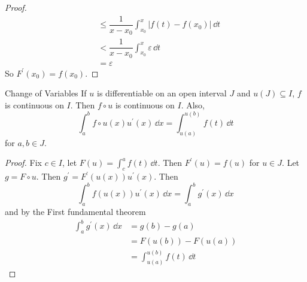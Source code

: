 \documentclass{report}
\begin{document}
\begin{proof}
\begin{align*}
                                                                                        &\leq \dfrac{1}{x - x_{0}} \int_{x_{0}}^{x} \lvert f(t) - f(x_{0}) \rvert \, \dd{ t} \\
                                                                                        &< \dfrac{ 1}{x - x_{0}} \int_{x_{0}}^{x} \varepsilon \, \dd{ t}  \\
                                                                                        &= \varepsilon
            \end{align*}
         So $F^{\prime}(x_{0}) = f(x_{0})$.
    \end{proof}

\begin{theorem}{Change of Variables}
    If $u$ is differentiable on an open interval $J$ and $u(J) \subseteq I$, $f$ is continuous on $I$. Then $f \circ u$ is continuous on $I$. Also, 
        \begin{equation*}
            \int_{a}^{b} f \circ u(x)u^{\prime}(x) \, \dd{x}  = \int_{u(a)}^{u(b)} f(t) \, \dd{t} 
        \end{equation*}
    for $a, b \in J$.
\end{theorem}
    \begin{proof}
        Fix $c \in I$, let $ F(u) = \int_{c}^{a} f(t) \, \dd{t} $. Then $F^{\prime}(u) = f(u)$ for $u \in J$. Let $g = F \circ u$. Then $g^{\prime} = F^{\prime}(u(x))u^{\prime}(x)$. Then
            \begin{equation*}
                \int_{a}^{b} f(u(x))u^{\prime}(x) \, \dd{x} = \int_{a}^{b} g^{\prime}(x) \, \dd{x} 
            \end{equation*}
        and by the First fundamental theorem
            \begin{align*}
                \int_{a}^{b} g^{\prime}(x) \, \dd{x} &= g(b) - g(a) \\
                                                     &= F(u(b)) - F(u(a)) \\
                                                     &= \int_{u(a)}^{u(b)} f(t) \, \dd{t} 
            \end{align*}
    \end{proof}
\end{document}
